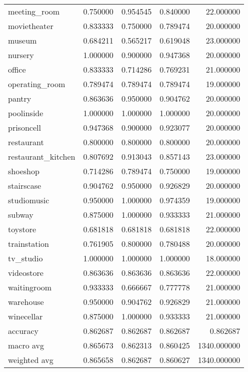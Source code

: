 \begin{tabular}{lrrrr}
meeting\_room        &   0.750000 &  0.954545 &  0.840000 &    22.000000 \\
movietheater        &   0.833333 &  0.750000 &  0.789474 &    20.000000 \\
museum              &   0.684211 &  0.565217 &  0.619048 &    23.000000 \\
nursery             &   1.000000 &  0.900000 &  0.947368 &    20.000000 \\
office              &   0.833333 &  0.714286 &  0.769231 &    21.000000 \\
operating\_room      &   0.789474 &  0.789474 &  0.789474 &    19.000000 \\
pantry              &   0.863636 &  0.950000 &  0.904762 &    20.000000 \\
poolinside          &   1.000000 &  1.000000 &  1.000000 &    20.000000 \\
prisoncell          &   0.947368 &  0.900000 &  0.923077 &    20.000000 \\
restaurant          &   0.800000 &  0.800000 &  0.800000 &    20.000000 \\
restaurant\_kitchen  &   0.807692 &  0.913043 &  0.857143 &    23.000000 \\
shoeshop            &   0.714286 &  0.789474 &  0.750000 &    19.000000 \\
stairscase          &   0.904762 &  0.950000 &  0.926829 &    20.000000 \\
studiomusic         &   0.950000 &  1.000000 &  0.974359 &    19.000000 \\
subway              &   0.875000 &  1.000000 &  0.933333 &    21.000000 \\
toystore            &   0.681818 &  0.681818 &  0.681818 &    22.000000 \\
trainstation        &   0.761905 &  0.800000 &  0.780488 &    20.000000 \\
tv\_studio           &   1.000000 &  1.000000 &  1.000000 &    18.000000 \\
videostore          &   0.863636 &  0.863636 &  0.863636 &    22.000000 \\
waitingroom         &   0.933333 &  0.666667 &  0.777778 &    21.000000 \\
warehouse           &   0.950000 &  0.904762 &  0.926829 &    21.000000 \\
winecellar          &   0.875000 &  1.000000 &  0.933333 &    21.000000 \\
accuracy            &   0.862687 &  0.862687 &  0.862687 &     0.862687 \\
macro avg           &   0.865673 &  0.862313 &  0.860425 &  1340.000000 \\
weighted avg        &   0.865658 &  0.862687 &  0.860627 &  1340.000000 \\
\bottomrule
\end{tabular}
